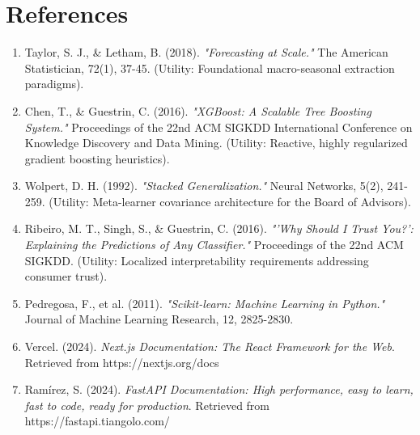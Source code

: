 \documentclass[12pt, a4paper]{article}
\begin{document}
\newpage

\section{References}
\begin{enumerate}
    \item Taylor, S. J., \& Letham, B. (2018). \textit{"Forecasting at Scale."} The American Statistician, 72(1), 37-45. (Utility: Foundational macro-seasonal extraction paradigms).
    \item Chen, T., \& Guestrin, C. (2016). \textit{"XGBoost: A Scalable Tree Boosting System."} Proceedings of the 22nd ACM SIGKDD International Conference on Knowledge Discovery and Data Mining. (Utility: Reactive, highly regularized gradient boosting heuristics).
    \item Wolpert, D. H. (1992). \textit{"Stacked Generalization."} Neural Networks, 5(2), 241-259. (Utility: Meta-learner covariance architecture for the Board of Advisors).
    \item Ribeiro, M. T., Singh, S., \& Guestrin, C. (2016). \textit{"'Why Should I Trust You?': Explaining the Predictions of Any Classifier."} Proceedings of the 22nd ACM SIGKDD. (Utility: Localized interpretability requirements addressing consumer trust).
    \item Pedregosa, F., et al. (2011). \textit{"Scikit-learn: Machine Learning in Python."} Journal of Machine Learning Research, 12, 2825-2830.
    \item Vercel. (2024). \textit{Next.js Documentation: The React Framework for the Web}. Retrieved from https://nextjs.org/docs
    \item Ramírez, S. (2024). \textit{FastAPI Documentation: High performance, easy to learn, fast to code, ready for production}. Retrieved from https://fastapi.tiangolo.com/
\end{enumerate}
\end{document}
